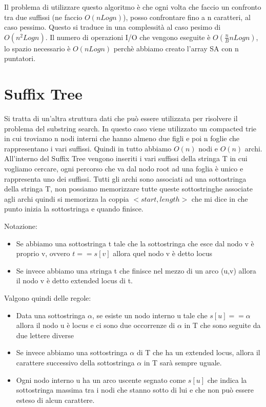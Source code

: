 \documentclass[14pt]{extreport}
\begin{document}
Il problema di utilizzare questo algoritmo è che ogni volta che faccio un confronto tra due suffissi (ne faccio $O(nLogn)$), posso confrontare fino a n caratteri, al caso pessimo. Questo si traduce in una complessità al caso pesimo di $O(n^2Logn)$.
Il numero di operazioni I/O che vengono eseguite è $O(\frac{n}{B}nLogn)$, lo spazio necessario è $O(nLogn)$ perchè abbiamo creato l'array SA con n puntatori.


\section{Suffix Tree}

Si tratta di un'altra struttura dati che può essere utilizzata per risolvere il problema del substring search. In questo caso viene utilizzato un compacted trie in cui troviamo n nodi interni che hanno almeno due figli e poi n foglie che rappresentano i vari suffissi.
Quindi in tutto abbiamo $O(n)$ nodi e $O(n)$ archi.
All'interno del Suffix Tree vengono inseriti i vari suffissi della stringa T in cui vogliamo cercare, ogni percorso che va dal nodo root ad una foglia è unico e rappresenta uno dei suffissi.
Tutti gli archi sono associati ad una sottostringa della stringa T, non possiamo memorizzare tutte queste sottostringhe associate agli archi quindi si memorizza la coppia $<start, length>$ che mi dice in che punto inizia la sottostringa e quando finisce.

Notazione:
\begin{itemize}
\item Se abbiamo una sottostringa t tale che la sottostringa che esce dal nodo v è proprio v, ovvero $t==s[v]$ allora quel nodo v è detto locus
\item Se invece abbiamo una stringa t che finisce nel mezzo di un arco (u,v) allora il nodo v è detto extended locus di t.
\end{itemize}

Valgono quindi delle regole:

\begin{itemize}
\item Data una sottostringa $\alpha$, se esiste un nodo interno u tale che $s[u]==\alpha$ allora il nodo u è locus e ci sono due occorrenze di $\alpha$ in T che sono seguite da due lettere diverse
\item Se invece abbiamo una sottostringa $\alpha$ di T che ha un extended locus, allora il carattere successivo della sottostringa $\alpha$ in T sarà sempre uguale.
\item Ogni nodo interno u ha un arco uscente segnato come $s[u]$ che indica la sottostringa massima tra i nodi che stanno sotto di lui e che non può essere esteso di alcun carattere.
\end{itemize}
\end{document}
